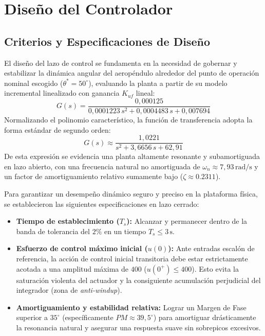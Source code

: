 \section{Diseño del Controlador}

\subsection{Criterios y Especificaciones de Diseño}
El diseño del lazo de control se fundamenta en la necesidad de gobernar y estabilizar la dinámica angular del aeropéndulo alrededor del punto de operación nominal escogido ($\theta^* = 50^\circ$), evaluando la planta a partir de su modelo incremental linealizado con ganancia $K_{uf}$ lineal:
\begin{equation}
G(s) = \frac{0{,}000125}{0{,}0001223\,s^2 + 0{,}0004483\,s + 0{,}007694}
\end{equation}
Normalizando el polinomio característico, la función de transferencia adopta la forma estándar de segundo orden:
\begin{equation}
G(s) \approx \frac{1{,}0221}{s^2 + 3{,}6656\,s + 62{,}91}
\end{equation}
De esta expresión se evidencia una planta altamente resonante y subamortiguada en lazo abierto, con una frecuencia natural no amortiguada de $\omega_n \approx 7{,}93\,\mathrm{rad/s}$ y un factor de amortiguamiento relativo sumamente bajo ($\zeta \approx 0.2311$). 

Para garantizar un desempeño dinámico seguro y preciso en la plataforma física, se establecieron las siguientes especificaciones en lazo cerrado:
\begin{itemize}
  \item \textbf{Tiempo de establecimiento ($T_s$):} Alcanzar y permanecer dentro de la banda de tolerancia del $2\%$ en un tiempo $T_s \le 3\,\mathrm{s}$.
  \item \textbf{Esfuerzo de control máximo inicial ($u(0)$):} Ante entradas escalón de referencia, la acción de control inicial transitoria debe estar estrictamente acotada a una amplitud máxima de $400$ ($u(0^+) \le 400$). Esto evita la saturación violenta del actuador y la consiguiente acumulación perjudicial del integrador (zona de \textit{anti-windup}).
  \item \textbf{Amortiguamiento y estabilidad relativa:} Lograr un Margen de Fase superior a $35^\circ$ (específicamente $PM \approx 39{,}5^\circ$) para amortiguar drásticamente la resonancia natural y asegurar una respuesta suave sin sobrepicos excesivos.
\end{itemize}

